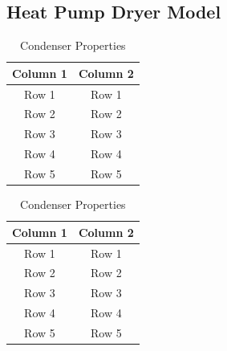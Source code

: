 \documentclass[12pt]{report}
\begin{document}
\begin{appendices}

\chapter{Heat Pump Dryer Model} \label{app:heatpumpmodel}

\begin{table}[htbp]
    \centering
    \begin{minipage}[b]{0.45\linewidth}
        \centering
        \begin{tabular}{|c|c|}
            \hline
            \textbf{Column 1} & \textbf{Column 2} \\
            \hline
            Row 1 & Row 1 \\
            Row 2 & Row 2 \\
            Row 3 & Row 3 \\
            Row 4 & Row 4 \\
            Row 5 & Row 5 \\
            \hline
        \end{tabular}
        \caption{Compressor Properties}
        \label{tab:table1}
    \end{minipage}
    \hfill
    \begin{minipage}[b]{0.45\linewidth}
        \centering
        \begin{tabular}{|c|c|}
            \hline
            \textbf{Column 1} & \textbf{Column 2} \\
            \hline
            Row 1 & Row 1 \\
            Row 2 & Row 2 \\
            Row 3 & Row 3 \\
            Row 4 & Row 4 \\
            Row 5 & Row 5 \\
            \hline
        \end{tabular}
        \caption{Condenser Properties}
        \label{tab:table2}
    \end{minipage}
\end{table}







\end{appendices}
\end{document}
